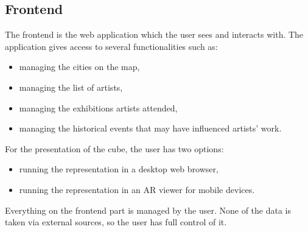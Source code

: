 \subsection{Frontend}\label{subsec:frontend}
The frontend is the web application which the user sees and interacts with. The application gives access to several functionalities such as:

\begin{itemize}
    \item managing the cities on the map,
    \item managing the list of artists,
    \item managing the exhibitions artists attended,
    \item managing the historical events that may have influenced artists' work.
\end{itemize}

For the presentation of the cube, the user has two options:

\begin{itemize}
    \item running the representation in a desktop web browser,
    \item running the representation in an AR viewer for mobile devices.
\end{itemize}

Everything on the frontend part is managed by the user. None of the data is taken via external sources, so the user has full control of it.
